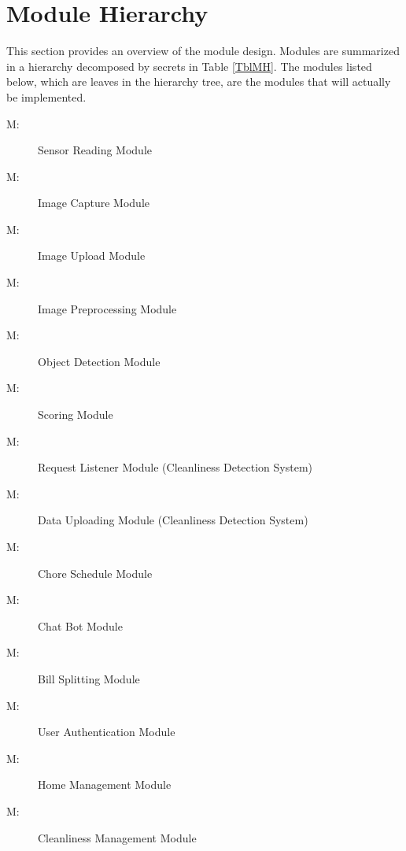 \documentclass[12pt, titlepage]{article}
\newcounter{mnum}
\newcommand{\mthemnum}{M\themnum}
\begin{document}
\section{Module Hierarchy} \label{SecMH}

This section provides an overview of the module design. Modules are summarized
in a hierarchy decomposed by secrets in Table \ref{TblMH}. The modules listed
below, which are leaves in the hierarchy tree, are the modules that will
actually be implemented.

\begin{description}
\item [ \mthemnum \label{mSR}:] Sensor Reading Module
\item [ \mthemnum \label{mIC}:] Image Capture Module
\item [ \mthemnum \label{mIU}:] Image Upload Module
\item [ \mthemnum \label{mIP}:] Image Preprocessing Module
\item [ \mthemnum \label{mOD}:] Object Detection Module
\item [ \mthemnum \label{mS}:] Scoring Module 
\item [ \mthemnum \label{mRL}:] Request Listener Module (Cleanliness Detection System)
\item [ \mthemnum \label{mDU}:] Data Uploading Module (Cleanliness Detection System)
\item [ \mthemnum \label{mCS}:] Chore Schedule Module
\item [ \mthemnum \label{mCB}:] Chat Bot Module
\item [ \mthemnum \label{mBS}:] Bill Splitting Module
\item [ \mthemnum \label{mUA}:] User Authentication Module
\item [ \mthemnum \label{mHM}:] Home Management Module
\item [ \mthemnum \label{mCM}:] Cleanliness Management Module
\end{description}
\end{document}
